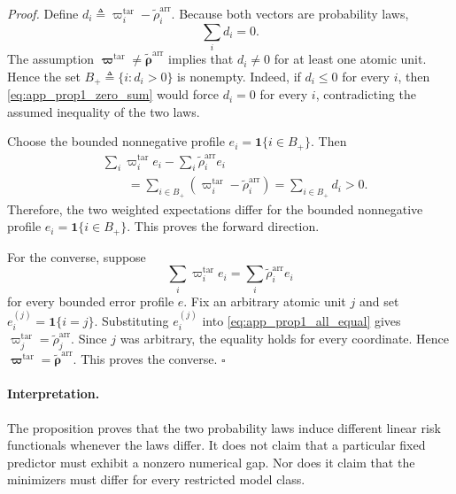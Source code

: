 \noindent\emph{Proof.}
Define $d_i\triangleq\varpi_i^{\mathrm{tar}}-\widetilde\rho_i^{\mathrm{arr}}$.
Because both vectors are probability laws,
\begin{equation}
    \sum_i d_i=0.
    \label{eq:app_prop1_zero_sum}
\end{equation}
The assumption
$\boldsymbol\varpi^{\mathrm{tar}}\neq
\widetilde{\boldsymbol\rho}^{\mathrm{arr}}$
implies that $d_i\neq0$ for at least one atomic unit.  Hence the set
$B_+\triangleq\{i:d_i>0\}$
is nonempty.  Indeed, if $d_i\le0$ for every $i$, then
\eqref{eq:app_prop1_zero_sum} would force $d_i=0$ for every $i$, contradicting
the assumed inequality of the two laws.

Choose the bounded nonnegative profile
$e_i=\mathbf{1}\{i\in B_+\}$.
Then
\begin{align}
 &
 \sum_i
 \varpi_i^{\mathrm{tar}}e_i
 -
 \sum_i
 \widetilde\rho_i^{\mathrm{arr}}e_i
 \nonumber\\
 &\qquad=
 \sum_{i\in B_+}
 \left(
 \varpi_i^{\mathrm{tar}}
 -
 \widetilde\rho_i^{\mathrm{arr}}
 \right)
 =
 \sum_{i\in B_+}d_i
 >0.
 \label{eq:app_prop1_difference}
\end{align}
Therefore, the two weighted expectations differ for the bounded nonnegative
profile $e_i=\mathbf{1}\{i\in B_+\}$.  This proves the forward direction.

For the converse, suppose
\begin{equation}
    \sum_i \varpi_i^{\mathrm{tar}}e_i
    =
    \sum_i \widetilde\rho_i^{\mathrm{arr}}e_i
    \label{eq:app_prop1_all_equal}
\end{equation}
for every bounded error profile $e$.  Fix an arbitrary atomic unit $j$ and set
$e_i^{(j)}=\mathbf{1}\{i=j\}$.
Substituting $e_i^{(j)}$ into
\eqref{eq:app_prop1_all_equal} gives
$\varpi_j^{\mathrm{tar}}=\widetilde\rho_j^{\mathrm{arr}}$.
Since $j$ was arbitrary, the equality holds for every coordinate.  Hence
$\boldsymbol\varpi^{\mathrm{tar}}=\widetilde{\boldsymbol\rho}^{\mathrm{arr}}$.
This proves the converse. \hfill$\square$

\paragraph{Interpretation.}
The proposition proves that the two probability laws induce different linear
risk functionals whenever the laws differ.  It does not claim that a particular
fixed predictor must exhibit a nonzero numerical gap.  Nor does it claim that
the minimizers must differ for every restricted model class.


